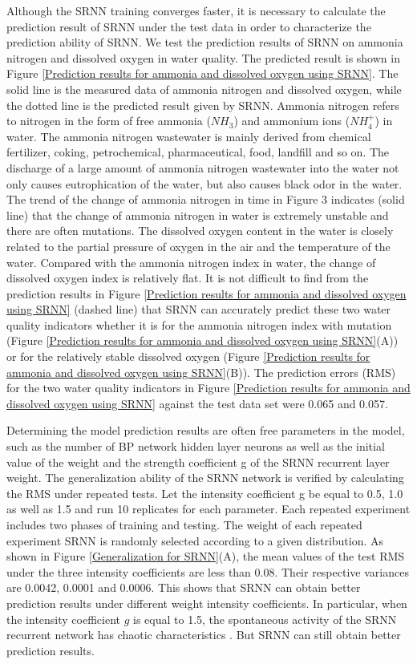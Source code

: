 \documentclass[runningheads]{llncs}
\begin{document}
Although the SRNN training converges faster, it is necessary to 
calculate the prediction result of SRNN under the test data in 
order to characterize the prediction ability of SRNN. 
We test the prediction results of SRNN on 
ammonia nitrogen and dissolved oxygen in water quality. 
The predicted result is shown in Figure \ref{Prediction results for ammonia 
and dissolved oxygen using SRNN}. The solid line 
is the measured data of ammonia nitrogen and dissolved oxygen, 
while the dotted line is the predicted result given by SRNN. 
Ammonia nitrogen refers to nitrogen in the form of free ammonia 
($NH_3$) and ammonium ions ($NH_4^+$) in water. The ammonia nitrogen 
wastewater is mainly derived from chemical fertilizer, coking, 
petrochemical, pharmaceutical, food, landfill and so on. 
The discharge of a large amount of ammonia nitrogen wastewater 
into the water not only causes eutrophication of the water, 
but also causes black odor in the water.
The trend of the change of ammonia nitrogen in time in Figure 3 
indicates (solid line) that the change of ammonia nitrogen in water 
is extremely unstable and there are often mutations. 
The dissolved oxygen content in the water is closely related to
the partial pressure of oxygen in the air and the 
temperature of the water. Compared with the ammonia nitrogen 
index in water, the change of dissolved oxygen index 
is relatively flat. It is not difficult to find from the prediction 
results in Figure \ref{Prediction results for ammonia and dissolved oxygen using SRNN} 
(dashed line) that SRNN can accurately predict 
these two water quality indicators whether it is for the 
ammonia nitrogen index with mutation (Figure \ref{Prediction results 
for ammonia and dissolved oxygen using SRNN}(A)) or 
for the relatively stable dissolved oxygen 
(Figure \ref{Prediction results for ammonia and dissolved oxygen using SRNN}(B)). 
The prediction errors (RMS) for the two water quality 
indicators in Figure \ref{Prediction results for ammonia and dissolved 
oxygen using SRNN} against the test data set were 0.065 and 0.057.

Determining the model prediction results are often free parameters in the model, 
such as the number of BP network hidden layer neurons as well as the initial
value of the weight and the strength coefficient g of the SRNN recurrent 
layer weight. The generalization ability of the SRNN network is verified
by calculating the RMS under repeated tests. 
Let the intensity coefficient g be equal to 0.5, 1.0 as well as 1.5 and run 10 
replicates for each parameter. Each repeated experiment includes two
phases of training and testing. The weight of each repeated experiment 
SRNN is randomly selected according to a given distribution. 
As shown in Figure \ref{Generalization for SRNN}(A), the mean values of the test
RMS under the three intensity coefficients are less 
than 0.08. Their respective variances are 0.0042, 0.0001 and 0.0006. This 
shows that SRNN can obtain better prediction results under different weight
intensity coefficients. In particular, when the intensity coefficient
$g$ is equal to 1.5, the spontaneous activity of the SRNN recurrent network has
chaotic characteristics \cite{RN17}. But SRNN can still obtain better prediction results.
\end{document}

